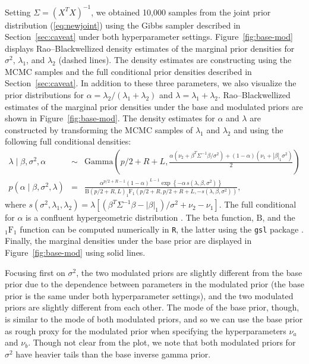 \documentclass[12pt]{article}
\begin{document}
Setting $\Sigma = (X^TX)^{-1}$, we obtained 10,000 samples from the joint prior 
distribution (\ref{eq:newjoint}) using the Gibbs sampler described in 
Section~\ref{sec:caveat} under both hyperparameter settings. Figure~\ref{fig:base-mod}
displays Rao--Blackwellized density estimates of the marginal prior densities for
$\sigma^2$, $\lambda_1$, and $\lambda_2$ (dashed lines). The density estimates are
constructing using the MCMC samples and the full conditional prior densities
described in Section~\ref{sec:caveat}. 
In addition to these three parameters, we also visualize the prior distributions for 
$\alpha = \lambda_2/(\lambda_1 + \lambda_2)$ and $\lambda = \lambda_1 + \lambda_2$. 
Rao--Blackwellized estimates of the marginal prior densities
under the base and modulated priors are shown in Figure~\ref{fig:base-mod}.
The density estimates for $\alpha$ and $\lambda$
are constructed by transforming the MCMC samples of $\lambda_1$ and $\lambda_2$
and using the following full conditional densities:
\begin{eqnarray*}
	\lambda \mid \beta, \sigma^2, \alpha &\sim& \mbox{Gamma}\left(
		p/2 + R + L, \frac{\alpha\left(\nu_2 + \beta^T \Sigma^{-1}\beta/\sigma^2\right)
			+ (1-\alpha)\left(\nu_1 + |\beta|_1\sigma^2\right)}{2}\right) \\
	p(\alpha \mid \beta, \sigma^2, \lambda) &=& \frac{\alpha^{p/2+R-1}(1-\alpha)^{L-1}
		\exp\left\{-\alpha \, s(\lambda, \beta, \sigma^2)\right\}}
		{\mbox{B}(p/2+R,L) _1\mbox{F}_1\left(p/2+R, p/2+R+L, -s(\lambda, \beta, \sigma^2)\right)},
\end{eqnarray*}
where $s(\sigma^2, \lambda_1, \lambda_2) = 
	\lambda\left[(\beta^T\Sigma^{-1}\beta - |\beta|_1)/\sigma^2 + \nu_2 - \nu_1\right]$.
The full conditional for $\alpha$ is a confluent hypergeometric distribution \citep{gord:98}. 
The beta function, $\mbox{B}$, and the $_1\mbox{F}_1$ function can be computed numerically in 
\texttt{R}, the latter using the \texttt{gsl} package \citep{hank:06}.
Finally, the marginal densities under the base prior are displayed in Figure~\ref{fig:base-mod} 
using solid lines. 

Focusing first on $\sigma^2$, the two modulated priors are slightly different from the
base prior due to the dependence between parameters in the modulated prior (the
base prior is the same under both hyperparameter settings), and the two modulated
priors are slightly different from each other. The mode of the base prior, though, is 
similar to the mode of both modulated priors, and so we can use the base prior as rough 
proxy for the modulated prior when specifying the hyperparameters $\nu_a$ and $\nu_b$. 
Though not clear from the plot, we note that both modulated priors for $\sigma^2$ have 
heavier tails than the base inverse gamma prior.
\end{document}
